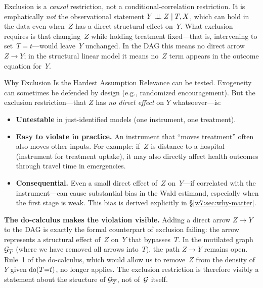 \documentclass[master.tex]{subfiles}
\begin{document}
\noindent Exclusion is a \emph{causal} restriction, not a
conditional-correlation restriction.  It is emphatically
\emph{not} the observational statement $Y \perp\!\!\!\perp Z \mid T, X$,
which can hold in the data even when~$Z$ has a direct structural
effect on~$Y$.  What exclusion requires is that changing~$Z$
while holding treatment fixed---that is, intervening to
set~$T = t$---would leave~$Y$ unchanged.  In the DAG this means
no direct arrow $Z \to Y$; in the structural linear model it means
no~$Z$ term appears in the outcome equation for~$Y$.

\begin{warn}{Why Exclusion Is the Hardest Assumption}
Relevance can be tested.  Exogeneity can sometimes be defended by
design (e.g., randomized encouragement).  But the exclusion
restriction---that $Z$ has \emph{no direct effect} on $Y$
whatsoever---is:
\begin{itemize}
  \item \textbf{Untestable} in just-identified models (one
    instrument, one treatment).
  \item \textbf{Easy to violate in practice.}  An instrument that
    ``moves treatment'' often also moves other inputs.  For example:
    if~$Z$ is distance to a hospital (instrument for treatment
    uptake), it may also directly affect health outcomes through
    travel time in emergencies.
  \item \textbf{Consequential.}  Even a small direct effect of~$Z$
    on~$Y$---if correlated with the instrument---can cause
    substantial bias in the Wald estimand, especially when the
    first stage is weak.  This bias is derived explicitly in
    \S\ref{w7:sec:why-matter}.
\end{itemize}
\end{warn}

\noindent\textbf{The do-calculus makes the violation visible.}
Adding a direct arrow $Z \to Y$ to the DAG is exactly the formal
counterpart of exclusion failing: the arrow represents a structural
effect of~$Z$ on~$Y$ that bypasses~$T$.  In the mutilated graph
$\mathcal{G}_{\overline{T}}$ (where we have removed all arrows into~$T$),
the path $Z \to Y$ remains open.  Rule~1 of the do-calculus, which would allow us to remove~$Z$
from the density of~$Y$ given $\mathrm{do}(T{=}t)$, no longer applies.
The exclusion restriction is therefore visibly a statement about the
structure of $\mathcal{G}_{\overline{T}}$, not of~$\mathcal{G}$ itself.
\end{document}
